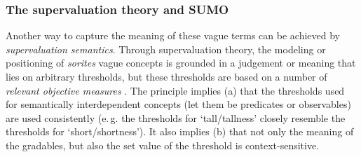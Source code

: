 \documentclass[11pt]{article}
\begin{document}
\subsubsection{The supervaluation theory and SUMO}
%


Another way to capture the meaning of these vague terms can be achieved by \textit{supervaluation semantics}. 
Through supervaluation theory, the modeling or positioning of \emph{sorites} vague concepts is grounded in a 
judgement or meaning that lies on arbitrary thresholds, but these thresholds are based on a number of \textit{relevant objective measures} \cite{Bennett06kr}. 
The principle implies (a) that the thresholds used for semantically interdependent concepts 
(let them be predicates or observables) are used consistently (e.\,g. the thresholds for `tall/tallness' 
closely resemble the thresholds for `short/shortness'). It also implies (b) that not only the meaning of 
the gradables, but also the set value of the threshold is context-sensitive.
 
\end{document}
